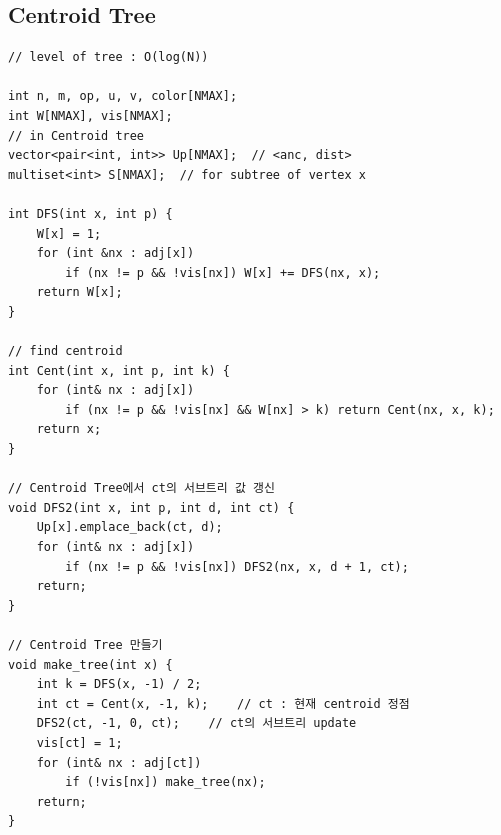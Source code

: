 \documentclass[landscape, 8pt, a4paper, oneside, twocolumn]{extarticle}
\begin{document}
\subsection {Centroid Tree}
\begin{verbatim}
// level of tree : O(log(N))

int n, m, op, u, v, color[NMAX];
int W[NMAX], vis[NMAX];
// in Centroid tree
vector<pair<int, int>> Up[NMAX];  // <anc, dist>
multiset<int> S[NMAX];  // for subtree of vertex x

int DFS(int x, int p) {
    W[x] = 1;
    for (int &nx : adj[x])
        if (nx != p && !vis[nx]) W[x] += DFS(nx, x);
    return W[x];
}

// find centroid
int Cent(int x, int p, int k) {
    for (int& nx : adj[x])
        if (nx != p && !vis[nx] && W[nx] > k) return Cent(nx, x, k);
    return x;
}

// Centroid Tree에서 ct의 서브트리 값 갱신
void DFS2(int x, int p, int d, int ct) {
    Up[x].emplace_back(ct, d);
    for (int& nx : adj[x])
        if (nx != p && !vis[nx]) DFS2(nx, x, d + 1, ct);
    return;
}

// Centroid Tree 만들기
void make_tree(int x) {
    int k = DFS(x, -1) / 2;
    int ct = Cent(x, -1, k);    // ct : 현재 centroid 정점
    DFS2(ct, -1, 0, ct);    // ct의 서브트리 update
    vis[ct] = 1;
    for (int& nx : adj[ct])
        if (!vis[nx]) make_tree(nx);
    return;
}
\end{verbatim}
\end{document}
